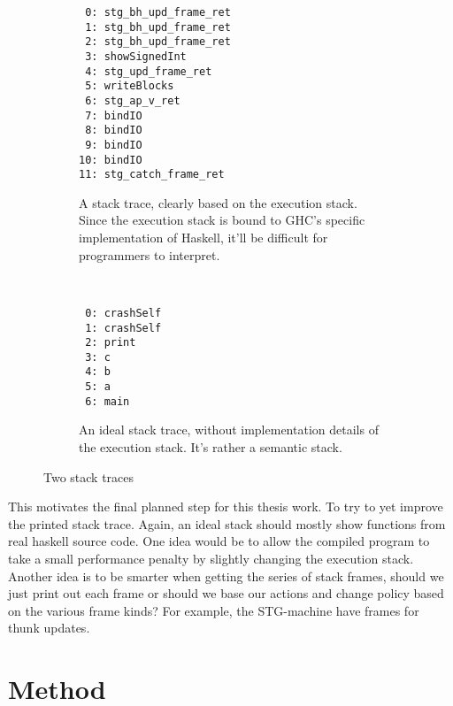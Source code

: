 \begin{figure}
  \begin{subfigure}[t]{0.5\textwidth}
    {\small
    \begin{verbatim}
 0: stg_bh_upd_frame_ret
 1: stg_bh_upd_frame_ret
 2: stg_bh_upd_frame_ret
 3: showSignedInt
 4: stg_upd_frame_ret
 5: writeBlocks
 6: stg_ap_v_ret
 7: bindIO
 8: bindIO
 9: bindIO
10: bindIO
11: stg_catch_frame_ret
    \end{verbatim}
  }%
    \caption{A stack trace, clearly based on the execution stack. Since the
      execution stack is bound to GHC's specific implementation of Haskell,
      it'll be difficult for programmers to interpret.}
    \label{fig:trace_goal1}
  \end{subfigure}
        ~ %
        \begin{subfigure}[t]{0.5\textwidth}
    {\small
          \begin{verbatim}
 0: crashSelf
 1: crashSelf
 2: print
 3: c
 4: b
 5: a
 6: main
          \end{verbatim}
  }%
          \caption{An ideal stack trace, without implementation details of the
            execution stack. It's rather a semantic stack.}
          \label{fig:trace_goal2}
        \end{subfigure}
        \caption{Two stack traces
        }\label{fig:traces}
\end{figure}


This motivates the final planned step for this thesis work. To try to yet
improve the printed stack trace. Again, an ideal stack should mostly show
functions from real haskell source code.  One idea would be to allow the
compiled program to take a small performance penalty by slightly
changing the execution stack. Another idea is to be smarter when getting the
series of stack frames, should we just print out each frame or should we base
our actions and change policy based on the various frame kinds?
For example, the STG-machine have frames for thunk updates.


\section{Method}

